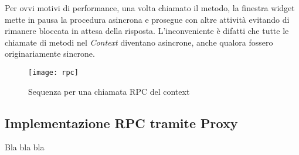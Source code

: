Per ovvi motivi di performance, una volta chiamato il metodo, la finestra widget mette in pausa la procedura asincrona e prosegue con altre attività evitando di rimanere bloccata in attesa della risposta. L'inconveniente è difatti che tutte le chiamate di metodi nel \textit{Context} diventano asincrone, anche qualora fossero originariamente sincrone.

\begin{figure}[H] 
  \centering 
  \texttt{[image: rpc]} 
  \caption{Sequenza per una chiamata RPC del context}
\end{figure}


\subsection{Implementazione RPC tramite Proxy}

Bla bla bla
